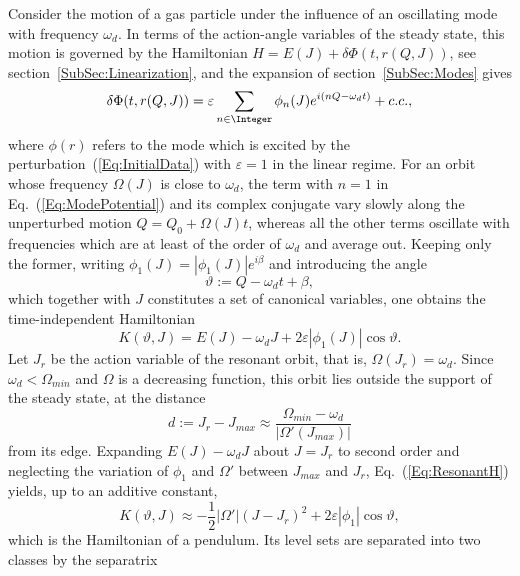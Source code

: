 Consider the motion of a gas particle under the influence of an oscillating mode with frequency $\omega_d$. In terms of the action-angle variables of the steady state, this motion is governed by the Hamiltonian $H = E(J) + \delta\Phi(t,r(Q,J))$, see section~\ref{SubSec:Linearization}, and the expansion of section~\ref{SubSec:Modes} gives
\begin{equation}
\delta\Phi(t,r(Q,J)) = \varepsilon\sum\limits_{n\in\Integer} \phi_n(J) e^{i(nQ - \omega_d t)} + c.c.,
\label{Eq:ModePotential}
\end{equation}
where $\phi(r)$ refers to the mode which is excited by the perturbation~(\ref{Eq:InitialData}) with $\varepsilon = 1$ in the linear regime. For an orbit whose frequency $\Omega(J)$ is close to $\omega_d$, the term with $n = 1$ in Eq.~(\ref{Eq:ModePotential}) and its complex conjugate vary slowly along the unperturbed motion $Q = Q_0 + \Omega(J)t$, whereas all the other terms oscillate with frequencies which are at least of the order of $\omega_d$ and average out. Keeping only the former, writing $\phi_1(J) = |\phi_1(J)| e^{i\beta}$ and introducing the angle
\begin{equation}
\vartheta := Q - \omega_d t + \beta,
\label{Eq:thetaDef}
\end{equation}
which together with $J$ constitutes a set of canonical variables, one obtains the time-independent Hamiltonian
\begin{equation}
K(\vartheta,J) = E(J) - \omega_d J + 2\varepsilon |\phi_1(J)|\cos\vartheta.
\label{Eq:ResonantH}
\end{equation}
Let $J_r$ be the action variable of the resonant orbit, that is, $\Omega(J_r) = \omega_d$. Since $\omega_d < \Omega_{min}$ and $\Omega$ is a decreasing function, this orbit lies outside the support of the steady state, at the distance
\begin{equation}
d := J_r - J_{max}\approx \frac{\Omega_{min} - \omega_d}{|\Omega'(J_{max})|}
\label{Eq:dDef}
\end{equation}
from its edge. Expanding $E(J) - \omega_d J$ about $J = J_r$ to second order and neglecting the variation of $\phi_1$ and $\Omega'$ between $J_{max}$ and $J_r$, Eq.~(\ref{Eq:ResonantH}) yields, up to an additive constant,
\begin{equation}
K(\vartheta,J)\approx -\frac{1}{2}|\Omega'|(J - J_r)^2 + 2\varepsilon |\phi_1|\cos\vartheta,
\label{Eq:Pendulum}
\end{equation}
which is the Hamiltonian of a pendulum. Its level sets are separated into two classes by the separatrix
